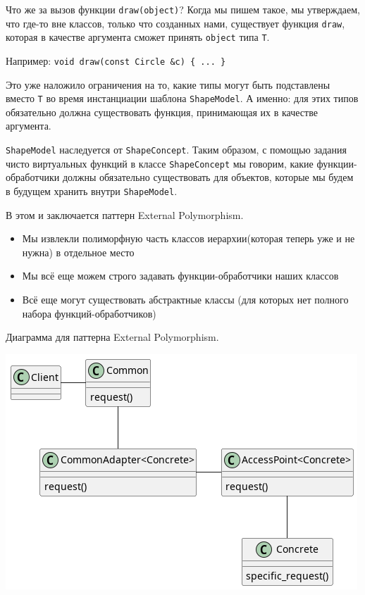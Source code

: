 \documentclass[14pt,a4paper]{article}
\providecommand{\tightlist}{%
	\setlength{\itemsep}{0pt}\setlength{\parskip}{0pt}}
\begin{document}
Что же за вызов функции \texttt{draw(object)}? Когда мы пишем такое, мы
утверждаем, что где-то вне классов, только что созданных нами,
существует функция \texttt{draw}, которая в качестве аргумента сможет
принять \texttt{object} типа \texttt{T}.

Например: \texttt{void\ draw(const\ Circle\ \&c)\ \{\ ...\ \}}

Это уже наложило ограничения на то, какие типы могут быть подставлены
вместо \texttt{T} во время инстанциации шаблона \texttt{ShapeModel}. А
именно: для этих типов обязательно должна существовать функция,
принимающая их в качестве аргумента.

\texttt{ShapeModel} наследуется от \texttt{ShapeConcept}. Таким образом,
с помощью задания чисто виртуальных функций в классе
\texttt{ShapeConcept} мы говорим, какие функции-обработчики должны
обязательно существовать для объектов, которые мы будем в будущем
хранить внутри \texttt{ShapeModel}.

В этом и заключается паттерн External Polymorphism.

\begin{itemize}
\tightlist
\item
  Мы извлекли полиморфную часть классов иерархии(которая теперь уже и не
  нужна) в отдельное место
\item
  Мы всё еще можем строго задавать функции-обработчики наших классов
\item
  Всё еще могут существовать абстрактные классы (для которых нет полного
  набора функций-обработчиков)
\end{itemize}

Диаграмма для паттерна External Polymorphism.

\includegraphics{EP.png}
\end{document}
